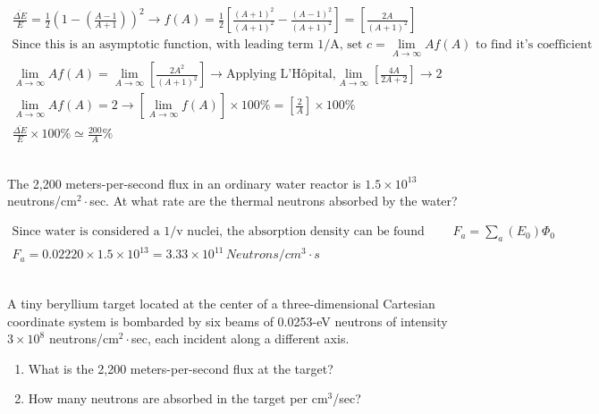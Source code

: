 \documentclass{homework}
\begin{document}
\begin{sol}
  \begin{gather*}
  \frac{\overline{\Delta E}}{E} = \frac{1}{2}(1-(\frac{A-1}{A+1}))^{2} \rightarrow f(A) = \frac{1}{2}\left[ \frac{(A + 1)^{2}}{(A + 1)^{2}}-\frac{(A-1)^{2}}{(A+1)^{2}} \right]
  =  \left[ \frac{2A}{(A + 1)^{2}} \right]\\
  \text{Since this is an asymptotic function, with leading term 1/A, set  } c = \lim_{A \to \infty} A f(A) \text{ to find it's coefficient}\\
  \lim_{A \to \infty} A f(A) = \lim_{A \to \infty} \left[ \frac{2A^{2}}{(A + 1)^{2}} \right] \rightarrow \text{Applying L’Hôpital,} \lim_{A \to \infty}\left[ \frac{4A}{2A + 2} \right]
  \rightarrow 2 \\
  \lim_{A \to \infty} A f(A) = 2 \rightarrow  \left[ \lim_{A \to \infty} f(A) \right] \times 100 \% = \left[\frac{2}{A}\right] \times 100\% \\
  \boxed{\frac{\overline{\Delta E}}{E} \times 100\% \simeq \frac{200}{A}\%}
  \end{gather*}
\end{sol}
\question \\
The 2,200 meters-per-second flux in an ordinary water reactor is 
$1.5 \times 10^{13}$ neutrons/cm$^{2}\!\cdot$sec. 
At what rate are the thermal neutrons absorbed by the water?

\begin{sol}
  \begin{gather*}
    \text{Since water is considered a 1/v nuclei, the absorption density can be found with } F_{a} = \textstyle \sum_{a}(E_{0})\varPhi_{0}\\
    F_{a} = 0.02220 \times 1.5 \times 10^{13} = 3.33\times 10^{11}\, Neutrons/cm^{3}\cdot s
  \end{gather*}
\end{sol}

\question\\
A tiny beryllium target located at the center of a three-dimensional Cartesian 
coordinate system is bombarded by six beams of 0.0253-eV neutrons of intensity 
$3 \times 10^{8}$ neutrons/cm$^{2}\!\cdot$sec, each incident along a different axis.

\begin{enumerate}[label=(\alph*)]
\item What is the 2,200 meters-per-second flux at the target?
\item How many neutrons are absorbed in the target per cm$^{3}$/sec?
\end{enumerate}
\end{document}
